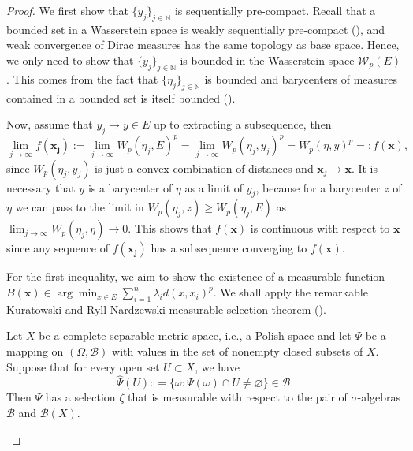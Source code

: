 \begin{proof}
	We first show that $\{ y_j \}_{j \in \mathbb{N}}$ is sequentially pre-compact.
	Recall that a bounded set in a Wasserstein space is
	weakly sequentially pre-compact (),
	and weak convergence of Dirac measures has the same topology as base space.
	Hence, we only need to show that $\{ y_j \}_{j \in \mathbb{N}}$ is bounded in the Wasserstein space $\mathcal{W}_p(E)$.
	This comes from the fact that $\{ \eta_j \}_{j \in \mathbb{N} }$ is bounded and barycenters of
	measures contained in a bounded set is itself bounded
	().

	Now, assume that $y_j \rightarrow y \in E$ up to extracting a subsequence, then
	\[
		\lim_{j \rightarrow \infty} f(\boldsymbol{x_j})
		:= \lim_{j \rightarrow \infty } W_p(\eta_j, E)^p
		= \lim_{ j \rightarrow \infty } W_p(\eta_j, y_j)^p =  W_p(\eta, y)^p =: f(\boldsymbol{x}),
	\]
	since $W_p(\eta_j , y_j)$ is just a convex combination of distances and
	$\boldsymbol{x}_j \rightarrow \boldsymbol{x}$.
	It is necessary that $y$ is a barycenter of $\eta$ as a limit of $y_j$,
	because for a barycenter $z$ of $\eta$ we can pass to the limit in $W_p(\eta_j, z) \geq W_p(\eta_j, E)$
	as $\lim_{j \rightarrow \infty} W_p(\eta_j, \eta) \rightarrow 0$.
	This shows that $f(\boldsymbol{x})$ is continuous with respect to $\boldsymbol{x}$ since
	any sequence of $f(\boldsymbol{x_j})$ has a subsequence converging to $f(\boldsymbol{x})$.

	For the first inequality,
	we aim to show the existence of a measurable function
	$ B(\boldsymbol{x}) \in \arg \min_{x \in E} \sum_{i=1}^{n} \lambda_i d(x, x_i)^p$.
	We shall apply the remarkable Kuratowski and Ryll-Nardzewski measurable selection theorem (\cite[Theorem 6.9.3]{Bogachev2007}).
	\begin{thm}
		Let \( X \) be a complete separable metric space, i.e., a Polish space and
		let \( \Psi \) be a mapping
		on \( ( \Omega , \mathcal { B } ) \) with values in the set of nonempty closed subsets of \( X \).
		Suppose that for every open set \( U \subset X \), we have
		\[ \widehat { \Psi } ( U ) : = \{ \omega : \Psi ( \omega ) \cap U \neq \varnothing \} \in \mathcal { B }. \]
		Then \( \Psi \) has a selection \( \zeta \) that is measurable with respect to
		the pair of \( \sigma \)-algebras \( \mathcal { B } \) and \( \mathcal { B } ( X ) \).
	\end{thm}


\end{proof}
